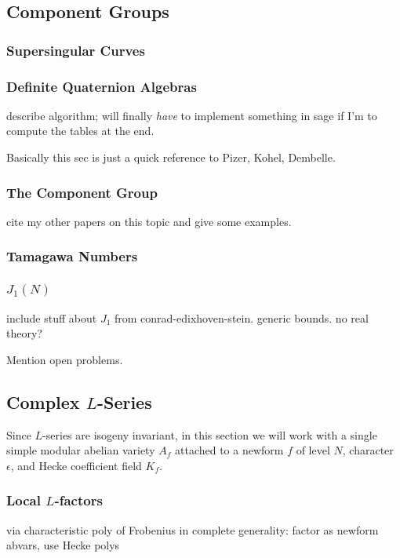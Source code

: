 \documentclass{article}
\begin{document}
\subsection{Component Groups}


\subsubsection{Supersingular Curves}

\subsubsection{Definite Quaternion Algebras}
describe algorithm; will finally {\em have} to implement
something in sage if I'm to compute the tables at the end.

Basically this sec is just a quick reference to Pizer, Kohel, Dembelle.

\subsubsection{The Component Group}
cite my other papers on this topic and give some examples.

\subsubsection{Tamagawa Numbers}

\subsubsection{$J_1(N)$}
include stuff about $J_1$ from conrad-edixhoven-stein.  generic
bounds.  no real theory?

Mention open problems.

\subsection{Complex $L$-Series}

Since $L$-series are isogeny invariant, in this section we will work with a
single simple modular abelian variety $A_f$ attached to a newform $f$ of level
$N$, character $\epsilon$, and Hecke coefficient field $K_f$.

\subsubsection{Local $L$-factors}
via characteristic poly of Frobenius in complete
generality: factor as newform abvars, use Hecke polys
\end{document}
